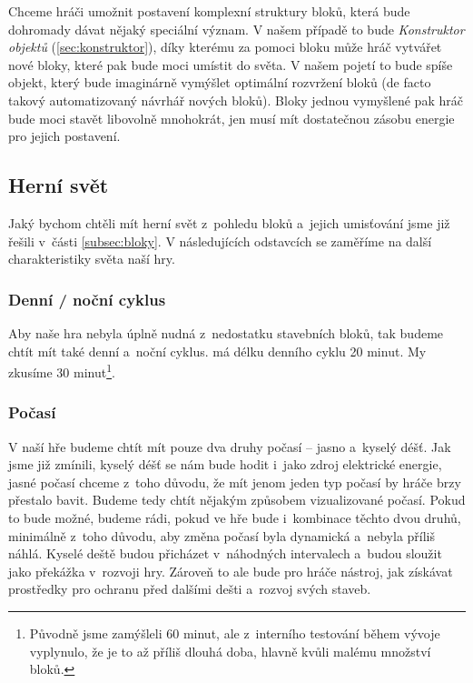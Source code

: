 Chceme hráči umožnit postavení komplexní struktury bloků, která bude dohromady dávat nějaký speciální význam. V našem případě to bude \textit{Konstruktor objektů} (\ref{sec:konstruktor}), díky kterému za pomoci bloku  může hráč vytvářet nové bloky, které pak bude moci umístit do světa. V našem pojetí to bude spíše objekt, který bude imaginárně vymýšlet optimální rozvržení bloků (de facto takový automatizovaný návrhář nových bloků). Bloky jednou vymyšlené pak hráč bude moci stavět libovolně mnohokrát, jen musí mít dostatečnou zásobu energie pro jejich postavení.

\subsection{Herní svět}

Jaký bychom chtěli mít herní svět z~pohledu bloků a~jejich umisťování jsme již řešili v~části \ref{subsec:bloky}. V následujících odstavcích se zaměříme na další charakteristiky světa naší hry.

\subsubsection{Denní / noční cyklus}
Aby naše hra nebyla úplně nudná z~nedostatku stavebních bloků, tak budeme chtít mít také denní a~noční cyklus. \MC{} má délku denního cyklu 20 minut. My zkusíme 30 minut\footnote{Původně jsme zamýšleli 60 minut, ale z~interního testování během vývoje vyplynulo, že je to až příliš dlouhá doba, hlavně kvůli malému množství bloků.}.

\subsubsection{Počasí}
\label{subsubsec:weather}

V naší hře budeme chtít mít pouze dva druhy počasí -- jasno a~kyselý déšť. Jak jsme již zmínili, kyselý déšť se nám bude hodit i~jako zdroj elektrické energie, jasné počasí chceme z~toho důvodu, že mít jenom jeden typ počasí by hráče brzy přestalo bavit. Budeme tedy chtít nějakým způsobem vizualizované počasí. Pokud to bude možné, budeme rádi, pokud ve hře bude i~kombinace těchto dvou druhů, minimálně z~toho důvodu, aby změna počasí byla dynamická a~nebyla příliš náhlá. Kyselé deště budou přicházet v~náhodných intervalech a~budou sloužit jako překážka v~rozvoji hry. Zároveň to ale bude pro hráče nástroj, jak získávat prostředky pro ochranu před dalšími dešti a~rozvoj svých staveb. 


